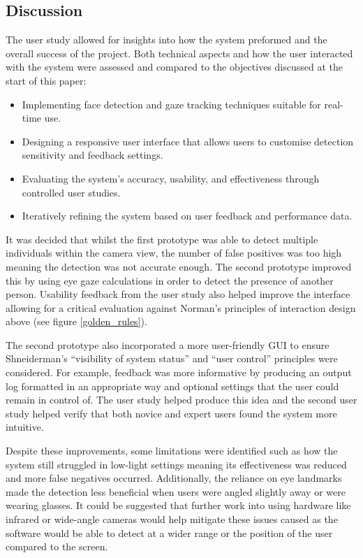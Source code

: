 \documentclass[12pt]{article}
\theoremstyle{plain}
\theoremstyle{definition}
\begin{document}
\subsection{Discussion}
\label{discussion}

The user study allowed for insights into how the system preformed and the overall success of the project. Both technical aspects and how the user interacted with the system were assessed and compared to the objectives discussed at the start of this paper:

\begin{itemize}
  \item Implementing face detection and gaze tracking techniques suitable for real-time use.
  \item Designing a responsive user interface that allows users to customise detection sensitivity and feedback settings.
  \item Evaluating the system’s accuracy, usability, and effectiveness through controlled user studies.
  \item Iteratively refining the system based on user feedback and performance data.
\end{itemize}

It was decided that whilst the first prototype was able to detect multiple individuals within the camera view, the number of false positives was too high meaning the detection was not accurate enough. The second prototype improved this by using eye gaze calculations in order to detect the presence of another person. Usability feedback from the user study also helped improve the interface allowing for a critical evaluation against Norman’s principles of interaction design \cite{} above (see figure \ref{golden_rules}).

The second prototype also incorporated a more user-friendly GUI to ensure Shneiderman’s “visibility of system status” and “user control” principles \cite{} were considered. For example, feedback was more informative by producing an output log formatted in an appropriate way and optional settings that the user could remain in control of. The user study helped produce this idea and the second user study helped verify that both novice and expert users found the system more intuitive.

Despite these improvements, some limitations were identified such as how the system still struggled in low-light settings meaning its effectiveness was reduced and more false negatives occurred. Additionally, the reliance on eye landmarks made the detection less beneficial when users were angled slightly away or were wearing glasses. It could be suggested that further work into using hardware like infrared or wide-angle cameras would help mitigate these issues caused as the software would be able to detect at a wider range or the position of the user compared to the screen.
\end{document}
